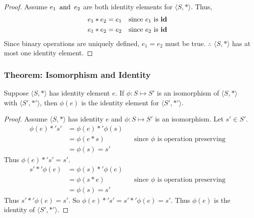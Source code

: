 \begin{proof}
    Assume $e_1 \operatorname{~\text{and}~} e_2$ are both identity elements for $\langle S, * \rangle$. Thus,
    \begin{align*}
        e_1 * e_2 & = e_1 && \text{since $e_1$ is $\operatorname{\textbf{id}}$} \\
        e_1 * e_2 & = e_2 && \text{since $e_2$ is $\operatorname{\textbf{id}}$}
    \end{align*}
    Since binary operations are uniquely defined, $e_1 = e_2$ must be true.
    $\therefore$ $\langle S, * \rangle$ has at most one identity element.
\end{proof}

\subsubsection*{Theorem: Isomorphism and Identity}
Suppose $\langle S, * \rangle$ has identity element $e$. If $\phi: S \mapsto S'$ is an isomorphism of $\langle S, * \rangle$ with $\langle S', *' \rangle$, then $\phi(e)$ is the identity element for $\langle S', *' \rangle$.

\begin{proof}
    Assume $\langle S, * \rangle$ has identity $e$ and $\phi: S \mapsto S'$ is an isomorphism. Let $s' \in S'$.
    \begin{align*}
        \phi(e) *' s' & = \phi(e) *' \phi(s) \\
        & = \phi(e * s) && \text{since $\phi$ is operation preserving} \\
        & = \phi(s) = s'
    \end{align*}
    Thus $\phi(e) *' s' = s'$.
    \begin{align*}
        s' *' \phi(e) & = \phi(s) *' \phi(e) \\
        & = \phi(s * e) && \text{since $\phi$ is operation preserving} \\
        & = \phi(s) = s'
    \end{align*}
    Thus $s' *' \phi(e) = s'$. So $\phi(e) *' s' = s' *' \phi(e) = s'$. Thus $\phi(e)$ is the identity of $\langle S', *' \rangle$.
\end{proof}